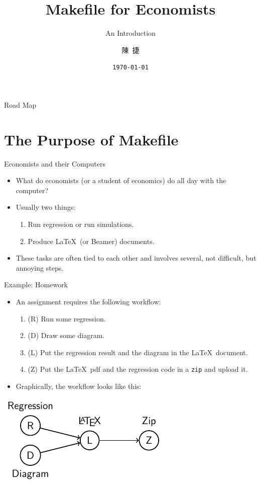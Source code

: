 \documentclass{beamer}
\title{\textbf{Makefile for Economists}}
\subtitle{An Introduction}
\author{陳\ 捷}
\date{\texttt{\today}}
\begin{document}
\begin{frame}{}
	\maketitle
\end{frame}

\begin{frame}{Road Map}
	\tableofcontents
\end{frame}

\section{The Purpose of Makefile}

\begin{frame}{Economists and their Computers}
	\begin{itemize}
		\item
			What do economists (or a student of economics) do all day with the computer?
			\pause
		\item
			Usually two things:
			\begin{enumerate}
				\item
					Run regression or run simulations.
				\item
					Produce \LaTeX\ (or Beamer) documents.
			\end{enumerate}
		\item
			These tasks are often tied to each other
			and involves several, not difficult, but annoying steps.
	\end{itemize}
\end{frame}

\begin{frame}{Example: Homework}
	\begin{itemize}
		\item
			An assignment requires the following workflow:
			\begin{enumerate}
				\item (R) Run some regression.
				\item (D) Draw some diagram.
				\item (L) Put the regression result and the diagram in the \LaTeX\ document.
				\item (Z) Put the \LaTeX\ pdf and the regression code in a \texttt{zip} and upload it.
			\end{enumerate}
		\item
			Graphically, the workflow looks like this:
	\end{itemize}
	\begin{center}
		\includegraphics[scale=1]{figures/homework-workflow.pdf}
	\end{center}
\end{frame}
\end{document}
